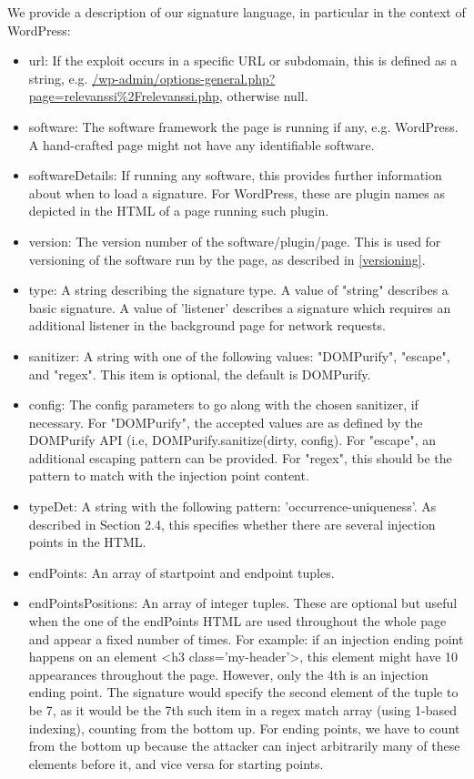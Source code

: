 We provide a description of our signature language, in particular in the context of WordPress:
\begin{itemize}
	\item
	url: If the exploit occurs in a specific URL or subdomain, this is defined as a string, e.g.
	\url{/wp-admin/options-general.php?page=relevanssi\%2Frelevanssi.php}, otherwise null.
	\item
	software: The software framework the page is running if any, e.g. WordPress. A hand-crafted page
	might not have any identifiable software.
	\item
	softwareDetails: If running any software, this provides further information about when to load a signature. For WordPress, these are plugin names as depicted in the HTML of a page running such plugin.
	\item
	version: The version number of the software/plugin/page. This is used for versioning of the software run by the page, as described in \autoref{versioning}.
	\item 
	type: A string describing the signature type. A value of "string" describes a basic signature. A value of 'listener' describes a signature which requires an additional listener in the background page for network requests.
	\item 
	sanitizer: A string with one of the following values: "DOMPurify", "escape", and "regex". This item is optional, the default is DOMPurify.
	\item
	config: The config parameters to go along with the chosen sanitizer, if necessary. For "DOMPurify", the accepted values are as defined by the DOMPurify API (i.e, DOMPurify.sanitize(dirty, config). For "escape", an additional escaping pattern can be provided. For "regex", this should be the pattern to match with the injection point content.
	\item
	typeDet: A string with the following pattern: 'occurrence-uniqueness'. As described in Section 2.4, this specifies whether there are several injection points in the HTML.
	\item
	endPoints: An array of startpoint and endpoint tuples.
	\item 
	endPointsPositions: An array of integer tuples. These are optional but useful when the one of the endPoints HTML are used throughout the whole page and appear a fixed number of times. For example: if an injection ending point happens on an element <h3 class='my-header'>, this element might have 10 appearances throughout the page. However, only the 4th is an injection ending point. The signature would specify the second element of the tuple to be 7, as it would be the 7th such item in a regex match array (using 1-based indexing), counting from the bottom up. For ending points, we have to count from the bottom up because the attacker can inject arbitrarily many of these elements before it, and vice versa for starting points.
\end{itemize}

